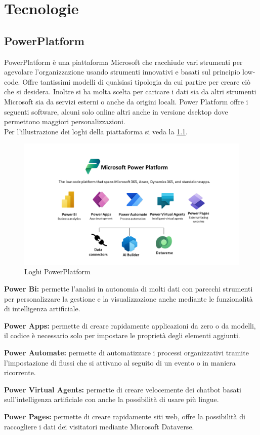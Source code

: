 \chapter{Tecnologie}
\section{PowerPlatform}
PowerPlatform è una piattaforma Microsoft che racchiude vari strumenti per agevolare l’organizzazione usando strumenti innovativi e basati sul principio low-code.
Offre tantissimi modelli di qualsiasi tipologia da cui partire per creare ciò che si desidera.
Inoltre si ha molta scelta per caricare i dati sia da altri strumenti Microsoft sia da servizi esterni o anche da origini locali. \newline
Power Platform offre i seguenti software, alcuni solo online altri anche in versione dsektop dove permettono maggiori personalizzazioni.\\
Per l'illustrazione dei loghi della piattaforma si veda la \figurename \space \ref*{fig:PowerPlatform}.
\begin{figure}[H]
    \centering\includegraphics[width=\textwidth, height=\textheight,keepaspectratio]{immagini/Icone-PowerPlatform.png}
    \caption{Loghi PowerPlatform}
    \label{fig:PowerPlatform}
\end{figure}
\begin{description}
    \item \textbf{Power Bi:} permette l’analisi in autonomia di molti dati con parecchi strumenti per personalizzare la gestione e la visualizzazione anche mediante le funzionalità di intelligenza artificiale.
    \item \textbf{Power Apps:} permette di creare rapidamente applicazioni da zero o da modelli, il codice è necessario solo per impostare le proprietà degli elementi aggiunti.
    \item \textbf{Power Automate:} permette di automatizzare i processi organizzativi tramite l’impostazione di flussi che si attivano al seguito di un evento o in maniera ricorrente.
    \item \textbf{Power Virtual Agents:} permette di creare velocemente dei chatbot basati sull’intelligenza artificiale con anche la possibilità di usare più lingue.
    \item \textbf{Power Pages:} permette di creare rapidamente siti web, offre la possibilità di raccogliere i dati dei visitatori mediante Microsoft Dataverse.
\end{description}

